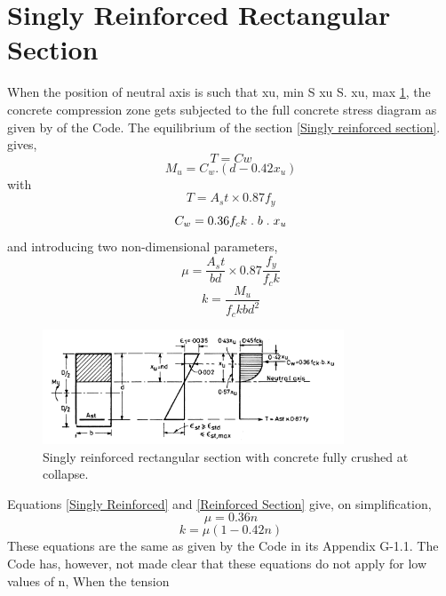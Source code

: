 \section{Singly Reinforced Rectangular Section}
When the position of neutral axis is such that xu, min S xu S. xu, max \fig \ref{Singly reinforced section 1}, the concrete
compression zone gets subjected to the full concrete stress diagram as given by  of the
Code. The equilibrium of the section \fig \ref{Singly reinforced section}. gives,
\begin{equation}
T=Cw
\label{Singly Reinforced}
\end{equation}
\begin{equation}
M_u=C_w.(d-0.42x_u)
\label{Reinforced Section}
\end{equation}
with
\hspace{2cm} $$T=A_st \times 0.87f_y$$
$$C_w=0.36f_ck\hspace{0.1cm}.\hspace{0.1cm} b\hspace{0.1cm} .\hspace{0.1cm} x_u$$
and introducing two non-dimensional parameters,
$$\mu=\frac {A_st}{bd} \times 0.87\frac {f_y}{f_ck}$$
$$k=\frac{M_u}{f_ckbd^2}$$
\begin{figure}
\centering
\includegraphics[width=0.8\textwidth]{images/ch2-1.png}
\caption{Singly reinforced rectangular section with concrete fully crushed at collapse.}
\label{Singly reinforced section 1}
\end{figure}
\newpage
Equations \eqn \ref{Singly Reinforced}  and \eqn \ref{Reinforced Section}  give, on simplification,
\begin{equation}
\mu = 0.36n
\label{Concrete}
\end{equation}
\begin{equation}
k=\mu(1-0.42n)
\label{Crushed at collapse}
\end{equation}
These equations are the same as given by the Code in its Appendix G-1.1. The Code has,
however, not made clear that these equations do not apply for low values of n, When the tension
